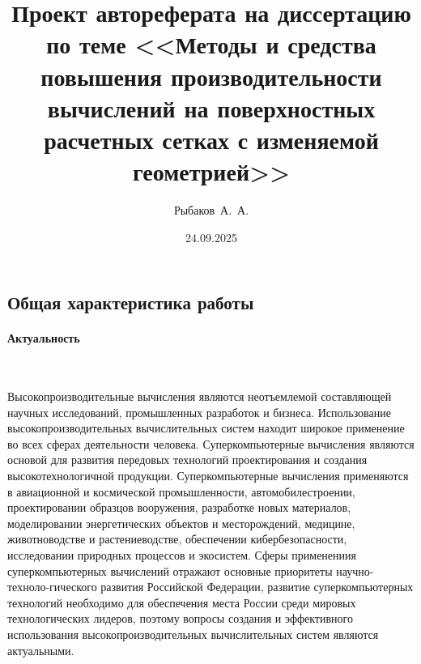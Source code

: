 \documentclass[a4paper,14pt]{extarticle}                     %
\theoremstyle{plain}                                         %
\begin{document}

\title{Проект автореферата на диссертацию по теме <<Методы и средства повышения производительности вычислений на поверхностных расчетных сетках с изменяемой геометрией>>}
\author{Рыбаков~А.~А.}
\date{24.09.2025}
\maketitle
\thispagestyle{empty}                                        %


\newpage
\subsection*{Общая характеристика работы}

\paragraph{Актуальность} \

Высокопроизводительные вычисления являются неотъемлемой составляющей научных исследований, промышленных разработок и бизнеса.
Использование высокопроизводительных вычислительных систем находит широкое применение во всех сферах деятельности человека.
Суперкомпьютерные вычисления являются основой для развития передовых технологий проектирования и создания высокотехнологичной продукции.
Суперкомпьютерные вычисления применяются в авиационной и космической промышленности, автомобилестроении, проектировании образцов вооружения, разработке новых материалов, моделировании энергетических объектов и месторождений, медицине, животноводстве и растениеводстве, обеспечении кибербезопасности, исследовании природных процессов и экосистем.
Сферы применениия суперкомпьютерных вычислений отражают основные приоритеты научно-техноло-гического развития Российской Федерации, развитие суперкомпьютерных технологий необходимо для обеспечения места России среди мировых технологических лидеров, поэтому вопросы создания и эффективного использования высокопроизводительных вычислительных систем являются актуальными.
\end{document}
